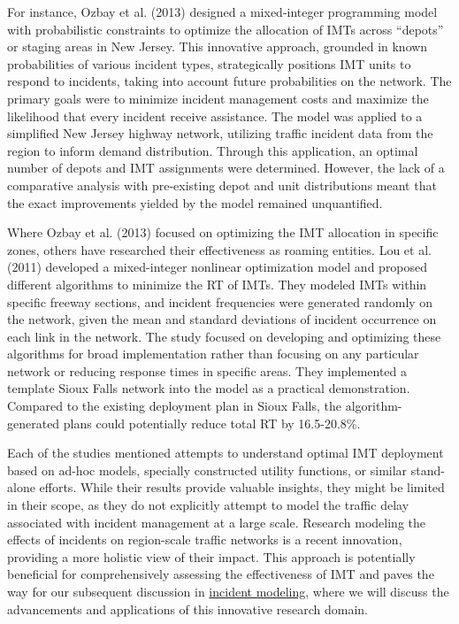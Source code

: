 \documentclass[fancy, oneside, mastersfancy, ms]{byuthesis}
\begin{document}
For instance, Ozbay et al. (2013) designed a mixed-integer programming
model with probabilistic constraints to optimize the allocation of IMTs
across ``depots'' or staging areas in New Jersey. This innovative
approach, grounded in known probabilities of various incident types,
strategically positions IMT units to respond to incidents, taking into
account future probabilities on the network. The primary goals were to
minimize incident management costs and maximize the likelihood that
every incident receive assistance. The model was applied to a simplified
New Jersey highway network, utilizing traffic incident data from the
region to inform demand distribution. Through this application, an
optimal number of depots and IMT assignments were determined. However,
the lack of a comparative analysis with pre-existing depot and unit
distributions meant that the exact improvements yielded by the model
remained unquantified.

Where Ozbay et al. (2013) focused on optimizing the IMT allocation in
specific zones, others have researched their effectiveness as roaming
entities. Lou et al. (2011) developed a mixed-integer nonlinear
optimization model and proposed different algorithms to minimize the RT
of IMTs. They modeled IMTs within specific freeway sections, and
incident frequencies were generated randomly on the network, given the
mean and standard deviations of incident occurrence on each link in the
network. The study focused on developing and optimizing these algorithms
for broad implementation rather than focusing on any particular network
or reducing response times in specific areas. They implemented a
template Sioux Falls network into the model as a practical
demonstration. Compared to the existing deployment plan in Sioux Falls,
the algorithm-generated plans could potentially reduce total RT by
16.5-20.8\%.

Each of the studies mentioned attempts to understand optimal IMT
deployment based on ad-hoc models, specially constructed utility
functions, or similar stand-alone efforts. While their results provide
valuable insights, they might be limited in their scope, as they do not
explicitly attempt to model the traffic delay associated with incident
management at a large scale. Research modeling the effects of incidents
on region-scale traffic networks is a recent innovation, providing a
more holistic view of their impact. This approach is potentially
beneficial for comprehensively assessing the effectiveness of IMT and
paves the way for our subsequent discussion in
\protect\hyperlink{sec-inc_modeling}{incident modeling}, where we will
discuss the advancements and applications of this innovative research
domain.
\end{document}
